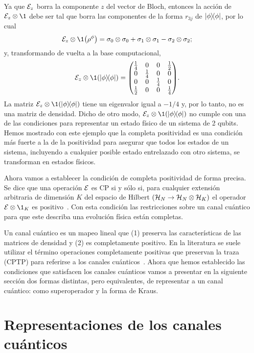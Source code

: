 Ya que $\mathcal{E}_z$ borra la componente $z$ del vector de Bloch, 
entonces la acción de $\E_z\otimes\1$ debe ser tal que borra 
las componentes de la forma $r_{3j}$ de $\dyad{\phi}{\phi}$, 
por lo cual
\begin{align}
\E_z\otimes\1 \qty({\rho}^{\phi})=
\pauli{0}{0}+\pauli{1}{1}-\pauli{2}{2};
\end{align}
y, transformando de vuelta a la base computacional,
\begin{align}
\E_z\otimes\1 \qty(\dyad{\phi}{\phi})=
\mqty( 
\frac{1}{4} & 0 & 0 & \frac{1}{2} \\
0 & \frac{1}{4} & 0 & 0 \\
0 & 0 & \frac{1}{4} & 0 \\
\frac{1}{2} & 0 & 0 & \frac{1}{4} \\
).
\end{align}
La matriz  $\E_z\otimes\1\qty(\dyad{\phi}{\phi})$ tiene un 
eigenvalor igual a $-1/4$ y, por lo tanto, no es una matriz de densidad.  
Dicho de otro modo, $\E_z\otimes\1\qty(\dyad{\phi}{\phi})$ 
no cumple con una de las condiciones para representar un estado físico
de un sistema de 2 qubits. Hemos mostrado con este ejemplo que la completa 
positividad es una condición más fuerte a la de la positividad para 
asegurar que todos los estados de un sistema, incluyendo a 
cualquier posible estado entrelazado con otro sistema, se transforman
en estados físicos.

Ahora vamos a establecer la condición de completa positividad 
de forma precisa. Se dice que una operación $\mathcal{E}$ es CP si 
y sólo si, para cualquier extensión arbitraria de dimensión $K$ 
del espacio de Hilbert $(\mathcal{H}_N \rightarrow \mathcal{H}_N \otimes \mathcal{H}_K)$ 
el operador $\E\otimes\1_K$ es positivo~\cite{bengtsson_zyczkowski_2017}. 
Con esta condición las restricciones sobre un canal cuántico 
para que este describa una evolución física están completas.

Un canal cuántico es un mapeo lineal que  (1) preserva las características
de las matrices de densidad y (2) es completamente positivo. 
En la literatura se suele utilizar el término operaciones 
completamente positivas que preservan la traza 
(CPTP) para referirse a los canales 
cuánticos~\cite{bengtsson_zyczkowski_2017}. 
Ahora que hemos establecido las condiciones que satisfacen los
canales cuánticos vamos a presentar en la siguiente sección 
dos formas distintas, pero equivalentes, de representar a un canal 
cuántico: como superoperador y la forma de Kraus.


\section{Representaciones de los canales cuánticos}
\label{sec:qtm-channels-representation}

